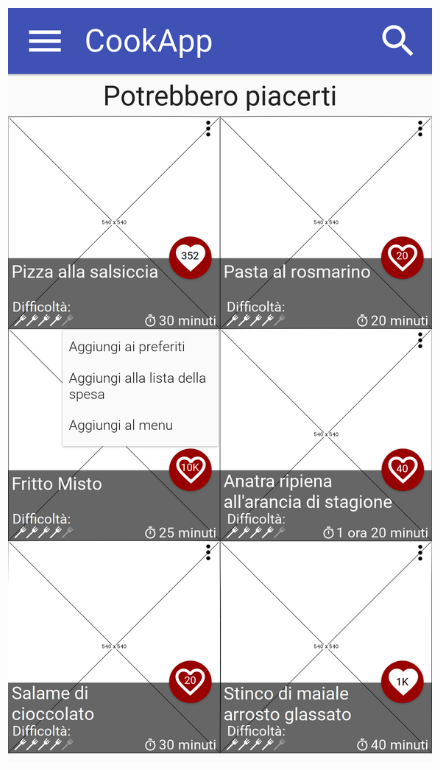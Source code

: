\begin{figure}[H]
	\begin{minipage}{.49\textwidth}
		\includegraphics[width=\textwidth]{img/wireframe/homepage_pallini.png}
	\end{minipage}
	\begin{minipage}{.49\textwidth}

\end{minipage}
\end{figure}
